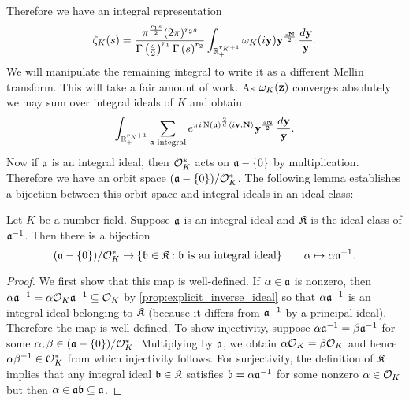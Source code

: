       Therefore we have an integral representation
      \[
        \zeta_{K}(s) = \frac{\pi^{\frac{r_{1}s}{2}}(2\pi)^{r_{2}s}}{\Gamma\left(\frac{s}{2}\right)^{r_{1}}\Gamma\left(s\right)^{r_{2}}}\int_{\mathbb{R}_{+}^{r_{K}+1}}\omega_{K}(i\mathbf{y})\mathbf{y}^{\frac{s\mathbf{N}}{2}}\,\frac{d\mathbf{y}}{\mathbf{y}}.
      \]
      We will manipulate the remaining integral to write it as a different Mellin transform. This will take a fair amount of work. As $\omega_{K}(\mathbf{z})$ converges absolutely we may sum over integral ideals of $K$ and obtain
      \[
        \int_{\mathbb{R}_{+}^{r_{K}+1}}\sum_{\text{$\mathfrak{a}$ integral}}e^{\pi i\operatorname{\mathrm{N}}(\mathfrak{a})^{\frac{2}{d}}\langle i\mathbf{y},\mathbf{N}\rangle}\mathbf{y}^{\frac{s\mathbf{N}}{2}}\,\frac{d\mathbf{y}}{\mathbf{y}}.
      \]
      Now if $\mathfrak{a}$ is an integral ideal, then $\mathcal{O}_{K}^{\ast}$ acts on $\mathfrak{a}-\{0\}$ by multiplication. Therefore we have an orbit space $(\mathfrak{a}-\{0\})/\mathcal{O}_{K}^{\ast}$. The following lemma establishes a bijection between this orbit space and integral ideals in an ideal class:

      \begin{lemma}\label{lem:Hecke_theta_function_lemma}
        Let $K$ be a number field. Suppose $\mathfrak{a}$ is an integral ideal and $\mathfrak{K}$ is the ideal class of $\mathfrak{a}^{-1}$. Then there is a bijection
        \[
          (\mathfrak{a}-\{0\})/\mathcal{O}_{K}^{\ast} \to \{\mathfrak{b} \in \mathfrak{K}:\text{$\mathfrak{b}$ is an integral ideal}\} \qquad \alpha \mapsto \alpha\mathfrak{a}^{-1}.
        \]
      \end{lemma}
      \begin{proof}
        We first show that this map is well-defined. If $\alpha \in \mathfrak{a}$ is nonzero, then $\alpha\mathfrak{a}^{-1} = \alpha\mathcal{O}_{K}\mathfrak{a}^{-1} \subseteq \mathcal{O}_{K}$ by \cref{prop:explicit_inverse_ideal} so that $\alpha\mathfrak{a}^{-1}$ is an integral ideal belonging to $\mathfrak{K}$ (because it differs from $\mathfrak{a}^{-1}$ by a principal ideal). Therefore the map is well-defined. To show injectivity, suppose $\alpha\mathfrak{a}^{-1} = \beta\mathfrak{a}^{-1}$ for some $\alpha,\beta \in (\mathfrak{a}-\{0\})/\mathcal{O}_{K}^{\ast}$. Multiplying by $\mathfrak{a}$, we obtain $\alpha\mathcal{O}_{K} = \beta\mathcal{O}_{K}$ and hence $\alpha\beta^{-1} \in \mathcal{O}_{K}^{\ast}$ from which injectivity follows. For surjectivity, the definition of $\mathfrak{K}$ implies that any integral ideal $\mathfrak{b} \in \mathfrak{K}$ satisfies $\mathfrak{b} = \alpha\mathfrak{a}^{-1}$ for some nonzero $\alpha \in \mathcal{O}_{K}$ but then $\alpha \in \mathfrak{a}\mathfrak{b} \subseteq \mathfrak{a}$.
      \end{proof}


